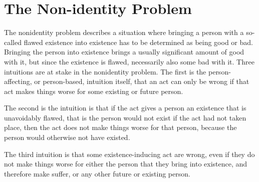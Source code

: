 
\section{The Non-identity Problem}
The nonidentity problem describes a situation where bringing a person with a so-called flawed existence into existence has to be determined as being good or bad. Bringing the person into existence brings a usually significant amount of good with it, but since the existence is flawed, necessarily also some bad with it. 
Three intuitions are at stake in the nonidentity problem. The first is the person-affecting, or person-based, intuition itself, that an act can only be wrong if that act makes things worse for some existing or future person. 

The second is the intuition is that if the act gives a person an existence that is unavoidably flawed, that is the person would not exist if the act had not taken place, then the act does not make things worse for that person, because the person would otherwise not have existed.

The third intuition is that some existence-inducing act are wrong, even if they do not make things worse for either the person that they bring into existence, and therefore make suffer, or any other future or existing person. 

